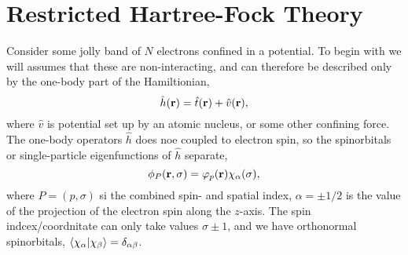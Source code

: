 \section{Restricted Hartree-Fock Theory}

Consider some jolly band of $N$ electrons confined in a potential. 
To begin with we will assumes that these are non-interacting, and can therefore be 
described only by the one-body part of the Hamiltionian,
\begin{equation}
    \hat{h}(\vb{r}) = \hat{t}(\vb{r}) + \hat{v}(\vb{r}),
\end{equation}
where $\hat{v}$ is potential set up by an atomic nucleus, or some other confining
force. The one-body operators $\hat{h}$ does noe coupled to electron spin, so the 
spinorbitals or single-particle eigenfunctions of $\hat{h}$ separate,
\begin{equation}
    \phi_P(\vb{r}, \sigma) = \varphi_p(\vb{r})\chi_\alpha(\sigma),
\end{equation}
where $P = (p, \sigma)$ si the combined spin- and spatial index, $\alpha = \pm 1/2$
is the value of the projection of the electron spin along the $z$-axis. The spin 
indcex/coordnitate can only take values $\sigma \pm 1$, and we have orthonormal 
spinorbitals, $\braket{\chi_\alpha}{\chi_\beta} = \delta_{\alpha\beta}$. 

